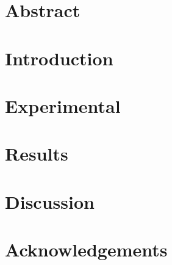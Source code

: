 \documentclass[english,letter,11pt]{scrartcl}
\date{\today}
\title{\doctitle}
\author{\docauthor}
\begin{document}
\maketitle
\section{Abstract}

\section{Introduction}

\section{Experimental}

\section{Results}

\section{Discussion}

\section{Acknowledgements}
\end{document}
